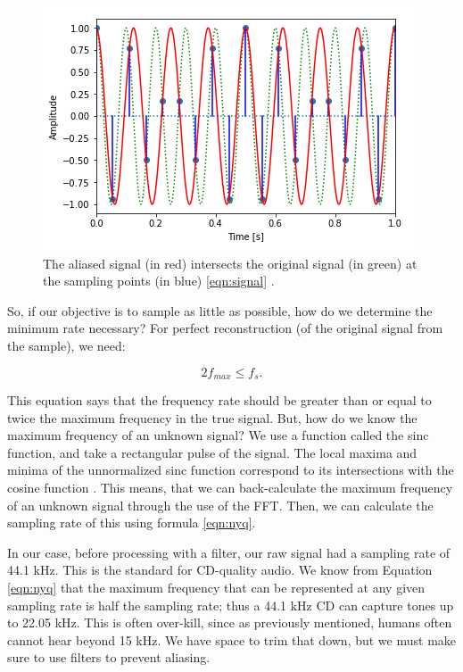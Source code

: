 \begin{figure}[H]
	\centering
	\includegraphics[scale = 1]{aliased_curve.png} %
	\caption{The aliased signal (in red) intersects the original signal (in green) at the sampling points (in blue) \ref{eqn:signal} \cite{notebook:sampling}.}
	\label{fig:aliase}
\end{figure}  

So, if our objective is to sample as little as possible, how do we determine the minimum rate necessary?  For perfect reconstruction (of the original signal from the sample), we need:

\begin{equation}
2f_{max}\leq f_{s}.
\label{eqn:nyq}
\end{equation}

This equation says that the frequency rate should be greater than or equal to twice the maximum frequency in the true signal.  But, how do we know the maximum frequency of an unknown signal? We use a function called the sinc function, and take a rectangular pulse of the signal.  The local maxima and minima of the unnormalized sinc function correspond to its intersections with the cosine function \cite{sinc:wiki}.  This means, that we can back-calculate the maximum frequency of an unknown signal through the use of the FFT.  Then, we can calculate the sampling rate of this using formula \ref{eqn:nyq}.

In our case, before processing with a filter, our raw signal had a sampling rate of 44.1 kHz.  This is the standard for CD-quality audio.  We know from Equation \ref{eqn:nyq} that the maximum frequency that can be represented at any given sampling rate is half the sampling rate; thus a 44.1 kHz CD can capture tones up to 22.05 kHz.  This is often over-kill, since as previously mentioned, humans often cannot hear beyond 15 kHz.  We have space to trim that down, but we must make sure to use filters to prevent aliasing.
